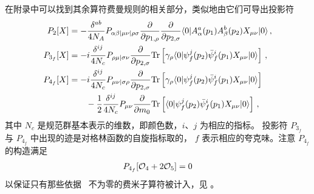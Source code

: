 在附录中可以找到其余算符费曼规则的相关部分，类似地由它们可导出投影符
\begin{equation}
  \begin{split}
    P_2[X] &=  - \frac{\delta^{ab}}{4 N_A} P_{\alpha \beta
      | \mu \nu | \rho \sigma}
    \frac{\partial }{\partial p_{1,\rho}}
    \frac{\partial }{\partial p_{2,\sigma}}
    \langle 0 | A_\alpha^a (p_1) A_\beta^b (p_2) X_{\mu \nu} | 0
    \rangle \,,\\
    P_{3_f}[X] &= -i \frac{\delta^{i j}}{4 N_c} P_{\rho
      \mu | \sigma \nu} \frac{\partial }{\partial p_{2,\sigma}} \text{Tr} \left[
      \gamma_{\rho}
    \langle 0 | \psi_f^j (p_2) \bar{\psi}_f^i (p_1) X_{\mu \nu}
    | 0 \rangle \right]\,,\\
    P_{4_f}[X] &= -i \frac{\delta^{i j}}{4 N_c} P_{\mu \nu
      | \sigma \rho} \frac{\partial }{\partial p_{2,\sigma}} \text{Tr} \left[
      \gamma_{\rho} \langle 0 | \psi_f^j (p_2) \bar{\psi}_f^i (p_1)
      X_{\mu \nu} | 0 \rangle \right] \\
    & \qquad - \frac{1}{2} \frac{\delta^{i j}}{4 N_c} P_{\mu
      \nu} \frac{\partial }{\partial m_0} \text{Tr} \left[ \langle 0 | \psi_f^j (p_2)
      \bar{\psi}_f^i (p_1) X_{\mu \nu} | 0 \rangle \right]\,,
    \label{eq:pj}
  \end{split}
\end{equation}
其中 $N_c$ 是规范群基本表示的维数，即颜色数，$i$、$j$ 为相应的指标。
投影符 $P_{3_f}$ 与 $P_{4_f}$ 中出现的迹是对格林函数的自旋指标取的，
$f$ 表示相应的夸克味。注意 $P_{4_f}$ 的构造满足
\begin{equation}
  \begin{split}
    P_{4_f}[\mathcal{O}_4 + 2\mathcal{O}_5] = 0
  \end{split}
\end{equation}
以保证只有那些依据 \eom\ 不为零的费米子算符被计入，见 。

